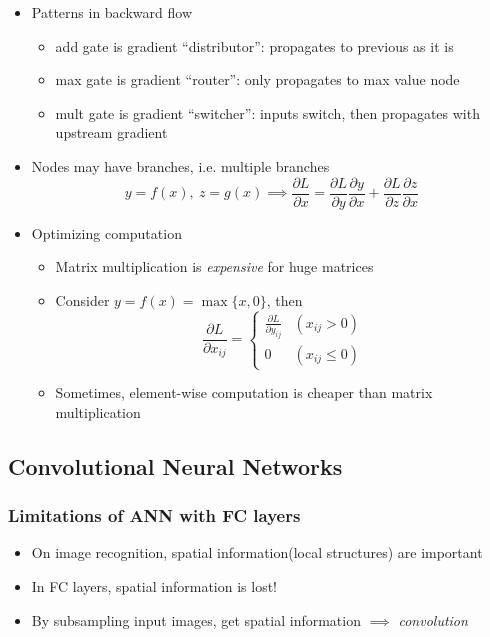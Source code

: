 \begin{itemize}
\begin{itemize}
    \end{itemize}
    \item Patterns in backward flow
    \begin{itemize}
        \item add gate is gradient ``distributor'': propagates to previous as it is
        \item max gate is gradient ``router'': only propagates to max value node
        \item mult gate is gradient ``switcher'': inputs switch, then propagates with upstream gradient
    \end{itemize}
    \item Nodes may have branches, i.e. multiple branches
    \begin{equation}
        y=f(x),~z=g(x)\implies\frac{\partial L}{\partial x}=\frac{\partial L}{\partial y}\frac{\partial y}{\partial x}+\frac{\partial L}{\partial z}\frac{\partial z}{\partial x}
    \end{equation}
    \item Optimizing computation
    \begin{itemize}
        \item Matrix multiplication is \textit{expensive} for huge matrices
        \item Consider $y=f(x)=\max\{x,0\}$, then
        \begin{equation}
            \frac{\partial L}{\partial x_{ij}}=\begin{cases}
                \frac{\partial L}{\partial y_{ij}} & (x_{ij}>0) \\
                0 & (x_{ij}\leq 0)
            \end{cases}
        \end{equation}
        \item Sometimes, element-wise computation is cheaper than matrix multiplication
    \end{itemize}
\end{itemize}

\subsection{Convolutional Neural Networks}

\subsubsection*{Limitations of ANN with FC layers}
\begin{itemize}
    \item On image recognition, spatial information(local structures) are important
    \item In FC layers, spatial information is lost!
    \item By subsampling input images, get spatial information $\implies$ \textit{convolution}
\end{itemize}
\begin{figures}
\end{figures}

